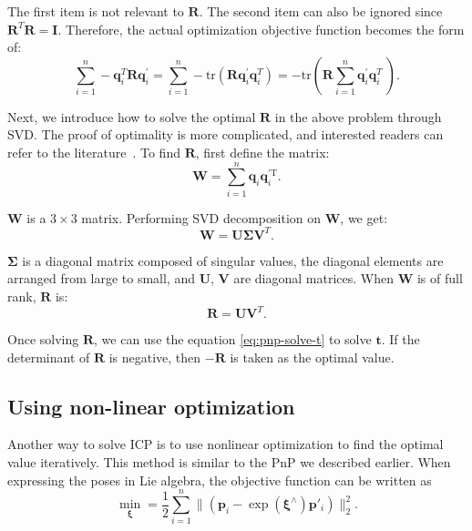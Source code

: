The first item is not relevant to $\mathbf{R}$. The second item can also be ignored since $\mathbf{R}^T\mathbf{R}=\mathbf{I}$. Therefore, the actual optimization objective function becomes the form of:
\begin{equation}
\sum\limits_{i = 1}^n - \mathbf{q}_i^T \mathbf{R} \mathbf{q}^\prime_i = \sum\limits_{i = 1}^n -\mathrm{tr} \left( \mathbf{R} \mathbf{q}_i^{\prime} \mathbf{q}^T_i \right) = - \mathrm{tr} \left( \mathbf{R} \sum\limits_{i = 1}^n \mathbf{q}_i^{\prime} \mathbf{q}^T_i \ \right).
\end{equation}

Next, we introduce how to solve the optimal $\mathbf{R}$ in the above problem through SVD. The proof of optimality is more complicated, and interested readers can refer to the literature~\cite{Arun1987, PomerleauColasSiegwart2015}. To find $\mathbf{R}$, first define the matrix:
\begin{equation}
\mathbf{W} =  \sum\limits_{i = 1}^n \mathbf{q}_i \mathbf{q}^{\prime \mathrm{T}}_i.
\end{equation}

$\mathbf{W}$ is a $3 \times 3$ matrix. Performing SVD decomposition on $\mathbf{W}$, we get:
\begin{equation}
\mathbf{W} = \mathbf{U} \boldsymbol{\Sigma} \mathbf{V}^T.
\end{equation}

$\boldsymbol{\Sigma}$ is a diagonal matrix composed of singular values, the diagonal elements are arranged from large to small, and $\mathbf{U}$, $\mathbf{V}$ are diagonal matrices. When $\mathbf{W}$ is of full rank, $\mathbf{R}$ is:
\begin{equation}
\mathbf{R} = \mathbf{U} \mathbf{V}^T.
\end{equation}

Once solving $\mathbf{R}$, we can use the equation \eqref{eq:pnp-solve-t} to solve $\mathbf{t}$. If the determinant of $\mathbf{R}$ is negative, then $-\mathbf{R}$ is taken as the optimal value.

\subsection{Using non-linear optimization}
Another way to solve ICP is to use nonlinear optimization to find the optimal value iteratively. This method is similar to the PnP we described earlier. When expressing the poses in Lie algebra, the objective function can be written as
\begin{equation}
\mathop {\min }\limits_{\boldsymbol{\xi}} = \frac{1}{2} \sum\limits_{i = 1}^n\| {\left( {{{\mathbf{p}}_i} - \exp \left( \boldsymbol{\xi}^\wedge \right) {\mathbf{p}}'_i} \right)} \|^2_2.
\end{equation}

